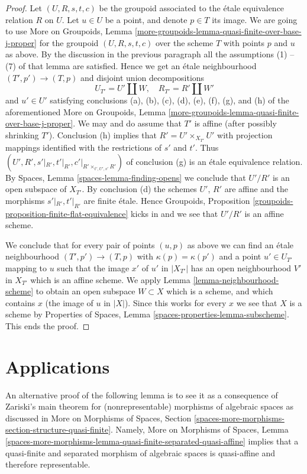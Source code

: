 \begin{proof}
\medskip\noindent
Let $(U, R, s, t, c)$ be the groupoid associated to the \'etale
equivalence relation $R$ on $U$. Let $u \in U$ be a point, and
denote $p \in T$ its image. We are going to use
More on Groupoids,
Lemma \ref{more-groupoids-lemma-quasi-finite-over-base-j-proper}
for the groupoid $(U, R, s, t, c)$ over the scheme $T$ with
points $p$ and $u$ as above.
By the discussion in the previous paragraph all the
assumptions (1) -- (7) of that lemma are satisfied.
Hence we get an \'etale neighbourhood
$(T', p') \to (T, p)$ and disjoint union decompositions
$$
U_{T'} = U' \amalg W, \quad
R_{T'} = R' \amalg W'
$$
and $u' \in U'$ satisfying conclusions
(a), (b), (c), (d), (e), (f), (g), and (h) of the aforementioned
More on Groupoids,
Lemma \ref{more-groupoids-lemma-quasi-finite-over-base-j-proper}.
We may and do assume that $T'$ is affine (after possibly shrinking $T'$).
Conclusion (h) implies that $R' = U' \times_{X_{T'}} U'$ with projection
mappings identified with the restrictions of $s'$ and $t'$.
Thus $(U', R', s'|_{R'}, t'|_{R'}, c'|_{R' \times_{t', U', s'} R'})$ of
conclusion (g) is an \'etale equivalence relation. By
Spaces, Lemma \ref{spaces-lemma-finding-opens}
we conclude that $U'/R'$ is an open subspace of $X_{T'}$. By conclusion (d)
the schemes $U'$, $R'$ are affine and the morphisms
$s'|_{R'}, t'|_{R'}$ are finite \'etale. Hence
Groupoids, Proposition \ref{groupoids-proposition-finite-flat-equivalence}
kicks in and we see that $U'/R'$ is an affine scheme.

\medskip\noindent
We conclude that for every pair of points $(u, p)$ as above we can
find an \'etale neighbourhood $(T', p') \to (T, p)$ with
$\kappa(p) = \kappa(p')$ and a point $u' \in U_{T'}$ mapping to $u$
such that the image $x'$ of $u'$ in $|X_{T'}|$ has an open neighbourhood
$V'$ in $X_{T'}$ which is an affine scheme. We apply
Lemma \ref{lemma-neighbourhood-scheme}
to obtain an open subspace $W \subset X$ which is a scheme, and
which contains $x$ (the image of $u$ in $|X|$).
Since this works for every $x$ we see that $X$
is a scheme by
Properties of Spaces, Lemma \ref{spaces-properties-lemma-subscheme}.
This ends the proof.
\end{proof}



\section{Applications}
\label{section-applications}

\noindent
An alternative proof of the following lemma is to see it as a consequence
of Zariski's main theorem for (nonrepresentable) morphisms of algebraic spaces
as discussed in More on Morphisms of Spaces, Section
\ref{spaces-more-morphisms-section-structure-quasi-finite}.
Namely, More on Morphisms of Spaces, Lemma
\ref{spaces-more-morphisms-lemma-quasi-finite-separated-quasi-affine}
implies that a quasi-finite and separated morphism of algebraic spaces
is quasi-affine and therefore representable.

